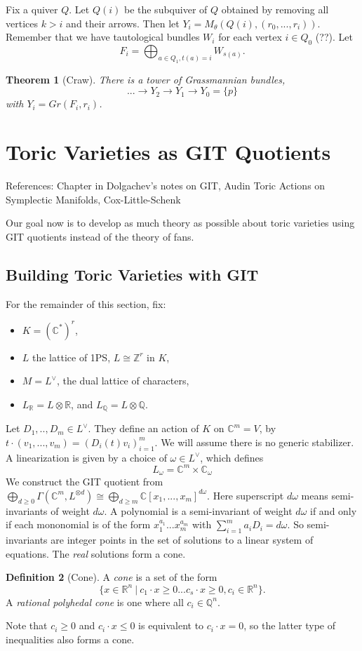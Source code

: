 \documentclass{article}
\newtheorem{theorem}{Theorem}
\theoremstyle{definition}
\newtheorem{definition}[theorem]{Definition}
\theoremstyle{remark}
\numberwithin{theorem}{section}
\newcommand{\C}{\mathbb{C}}
\newenvironment{thm}{
\begin{mdframed}
	\vspace{-0.5em}
	\begin{theorem}
}{
	\end{theorem}
\end{mdframed}
}
\newenvironment{defn}{
	\begin{mdframed}
		\vspace{-0.5em}
		\begin{definition}
		}{
		\end{definition}
	\end{mdframed}
}
\begin{document}
	Fix a quiver $Q$. Let $Q(i)$ be the subquiver of $Q$ obtained by removing all vertices $k>i$ and their arrows. Then let $Y_i = M_\theta(Q(i), (r_0,...,r_i))$. Remember that we have tautological bundles $W_i$ for each vertex $i\in Q_0$ (??). Let 
	$$F_i = \bigoplus_{a\in Q_1, t(a)=i}W_{s(a)}.$$
	\begin{thm}[Craw]
		There is a tower of Grassmannian bundles,
		$$...\to Y_2\to Y_1\to Y_0=\{{p}\}$$
		with  $Y_i = Gr(F_i, r_i)$.
	\end{thm}

	\section{Toric Varieties as GIT Quotients}
	References: Chapter in Dolgachev's notes on GIT, Audin Toric Actions on Symplectic Manifolds, Cox-Little-Schenk \vspace{1em}
	
	Our goal now is to develop as much theory as possible about toric varieties using GIT quotients instead of the theory of fans.
	
	\subsection{Building Toric Varieties with GIT}
	For the remainder of this section, fix:
	\begin{itemize}
		\item $K = (\C^\ast)^r$,
		\item $L$ the lattice of 1PS, $L\cong \mathbb{Z}^r$ in $K$,
		\item $M=L^\vee$, the dual lattice of characters,
		\item $L_\mathbb{R} = L\otimes \mathbb{R}$, and $L_\mathbb{Q} = L\otimes \mathbb{Q}$.
	\end{itemize}
	Let $D_1,..,D_m \in L^\vee$. They define an action of $K$ on $\C^m=V$, by $t\cdot(v_1,...,v_m) = (D_i(t)v_i)_{i=1}^m$. We will assume there is no generic stabilizer. A linearization is given by a choice of $\omega \in L^\vee$, which defines
	$$L_\omega = \C^m\times \C_\omega$$
	We construct the GIT quotient from $\bigoplus_{d\geq 0}\Gamma(\C^m, L^{\otimes d}) \cong \bigoplus_{d\geq m} \C[x_1,...,x_m]^{d\omega}$. Here superscript $d\omega$ means semi-invariants of weight $d\omega$. A polynomial is a semi-invariant of weight $d\omega$ if and only if each mononomial is of the form $x_1^{a_1}...x_m^{a_m}$ with $\sum_{i=1}^m a_iD_i = d\omega$. So semi-invariants are integer points in the set of solutions to a linear system of equations. The \emph{real} solutions form a cone.
	\begin{defn}[Cone]
		A \emph{cone} is a set of the form
		$$\{x\in \mathbb{R}^n ~|~ c_1\cdot x \geq 0 ... c_s\cdot x \geq 0, c_i \in \mathbb{R}^n\}.$$ 
		A \emph{rational polyhedal cone} is one where all $c_i\in\mathbb{Q}^n$.
	\end{defn}
	Note that $c_i\geq 0$ and $c_i\cdot x \leq 0$ is equivalent to $c_i\cdot x =0$, so the latter type of inequalities also forms a cone. \vspace{1em}
	
\end{document}
